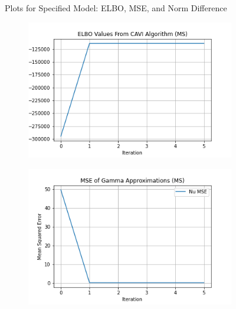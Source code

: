 \documentclass[letterpaper,12pt]{article}
\begin{document}
\begin{figure}[h]
\begin{subfigure}{0.32\textwidth}
    \end{subfigure}
    \caption{Plots for Specified Model: ELBO, MSE, and Norm Difference}
\end{figure}

\begin{figure}[h]
\centering
    \begin{subfigure}{0.32\textwidth}
        \includegraphics[width=\linewidth]{plots/ELBO_Values_From_CAVI_Algorithm_(MS).png}
    \end{subfigure}
    \begin{subfigure}{0.32\textwidth}
        \includegraphics[width=\linewidth]{plots/MSE_of_Nu_Approximations_(MS).png}
    \end{subfigure}
    \begin{subfigure}{0.32\textwidth}

\end{subfigure}
\end{figure}
\end{document}
